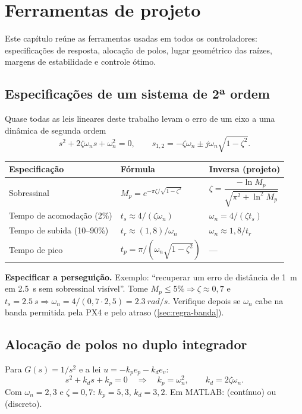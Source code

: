 \chapter{Ferramentas de projeto}
\label{cap:fundamentos}

Este capítulo reúne as ferramentas usadas em todos os controladores: especificações de
resposta, alocação de polos, lugar geométrico das raízes, margens de estabilidade e
controle ótimo.

\section{Especificações de um sistema de 2ª ordem}
Quase todas as leis lineares deste trabalho levam o erro de um eixo a uma dinâmica de
segunda ordem
\begin{equation}
  s^2 + 2\zeta\omega_n s + \omega_n^2 = 0 ,
  \qquad s_{1,2} = -\zeta\omega_n \pm j\omega_n\sqrt{1-\zeta^2}.
\end{equation}
\begin{table}[H]
\centering
\begin{tabular}{@{}lll@{}}
\toprule
Especificação & Fórmula & Inversa (projeto) \\
\midrule
Sobressinal & $M_p = e^{-\pi\zeta/\sqrt{1-\zeta^2}}$ &
  $\zeta = \dfrac{-\ln M_p}{\sqrt{\pi^2+\ln^2 M_p}}$ \\
Tempo de acomodação (2\%) & $t_s \approx 4/(\zeta\omega_n)$ & $\omega_n = 4/(\zeta t_s)$ \\
Tempo de subida (10--90\%) & $t_r \approx (1{,}8)/\omega_n$ & $\omega_n \approx 1{,}8/t_r$ \\
Tempo de pico & $t_p = \pi/(\omega_n\sqrt{1-\zeta^2})$ & --- \\
\bottomrule
\end{tabular}
\end{table}

\begin{receita}
\textbf{Especificar a perseguição.} Exemplo: ``recuperar um erro de distância de
\SI{1}{m} em \SI{2,5}{s} sem sobressinal visível''. Tome $M_p\le 5\%\Rightarrow\zeta\approx0{,}7$
e $t_s=\SI{2,5}{s}\Rightarrow\omega_n = 4/(0{,}7\cdot 2{,}5)=\SI{2,3}{rad/s}$.
Verifique depois se $\omega_n$ cabe na banda permitida pela PX4 e pelo atraso
(\cref{sec:regra-banda}).
\end{receita}

\section{Alocação de polos no duplo integrador}
Para $G(s)=1/s^2$ e a lei $u=-k_p e_p - k_d e_v$:
\begin{equation}
  s^2 + k_d s + k_p = 0
  \quad\Longrightarrow\quad
  \boxed{k_p = \omega_n^2,\qquad k_d = 2\zeta\omega_n.}
  \label{eq:pd-polos}
\end{equation}
Com $\omega_n=2{,}3$ e $\zeta=0{,}7$: $k_p=5{,}3$, $k_d=3{,}2$. Em MATLAB:
 (contínuo) ou  (discreto).

